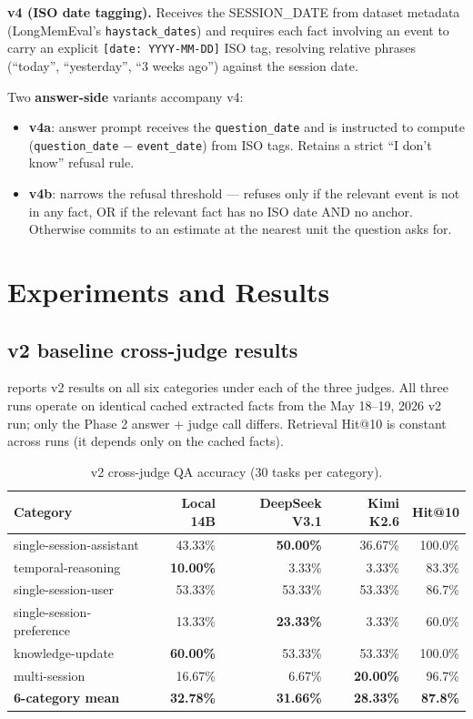 \documentclass{article}
\begin{document}
\textbf{v4 (ISO date tagging).} Receives the SESSION\_DATE from dataset metadata (LongMemEval's \texttt{haystack\_dates}) and requires each fact involving an event to carry an explicit \texttt{[date: YYYY-MM-DD]} ISO tag, resolving relative phrases (``today'', ``yesterday'', ``3 weeks ago'') against the session date.

Two \textbf{answer-side} variants accompany v4:

\begin{itemize}
  \item \textbf{v4a}: answer prompt receives the \texttt{question\_date} and is instructed to compute (\texttt{question\_date} $-$ \texttt{event\_date}) from ISO tags. Retains a strict ``I don't know'' refusal rule.
  \item \textbf{v4b}: narrows the refusal threshold --- refuses only if the relevant event is not in any fact, OR if the relevant fact has no ISO date AND no anchor. Otherwise commits to an estimate at the nearest unit the question asks for.
\end{itemize}

\section{Experiments and Results}
\label{sec:experiments}

\subsection{v2 baseline cross-judge results}

 reports v2 results on all six categories under each of the three judges. All three runs operate on identical cached extracted facts from the May 18--19, 2026 v2 run; only the Phase 2 answer + judge call differs. Retrieval Hit@10 is constant across runs (it depends only on the cached facts).

\begin{table}[t]
\centering
\small
\caption{v2 cross-judge QA accuracy (30 tasks per category).}
\label{tab:v2cross}
\begin{tabular}{lrrrr}
\toprule
Category                  & Local 14B & DeepSeek V3.1 & Kimi K2.6 & Hit@10 \\
\midrule
single-session-assistant  & 43.33\%   & \textbf{50.00\%} & 36.67\% & 100.0\% \\
temporal-reasoning        & \textbf{10.00\%} & 3.33\% & 3.33\% & 83.3\% \\
single-session-user       & 53.33\% & 53.33\% & 53.33\% & 86.7\% \\
single-session-preference & 13.33\% & \textbf{23.33\%} & 3.33\% & 60.0\% \\
knowledge-update          & \textbf{60.00\%} & 53.33\% & 53.33\% & 100.0\% \\
multi-session             & 16.67\% & 6.67\% & \textbf{20.00\%} & 96.7\% \\
\midrule
\textbf{6-category mean}  & \textbf{32.78\%} & \textbf{31.66\%} & \textbf{28.33\%} & \textbf{87.8\%} \\
\bottomrule
\end{tabular}
\end{table}
\end{document}
